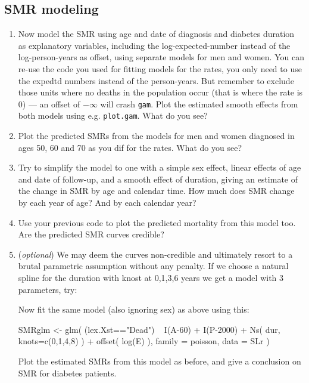 \subsection{SMR modeling}
\begin{enumerate}[resume]
\item Now model the SMR using age and date of diagnosis and diabetes
  duration as explanatory variables, including the log-expected-number
  instead of the log-person-years as offset, using separate models for
  men and women. 
  You can re-use the code you used for fitting models for the rates,
  you only need to use the expedtd numbers instead of the
  person-years. But remember to exclude those units where no deaths
  in the population occur (that is where the rate is 0) --- an
  offset of $-\infty$ will crash \texttt{gam}.
  Plot the estimated smooth effects from both models using
  e.g. \texttt{plot.gam}. What do you see?
\item Plot the predicted SMRs from the models for men and women
  diagnosed in ages 50, 60 and 70 as you dif for the rates. What do
  you see?
\item Try to simplify the model to one with a simple sex effect,
  linear effects of age and date of follow-up, and a smooth effect of
  duration, giving an estimate of the change in SMR by age and
  calendar time. How much does SMR change by each year of age? And by
  each calendar year?
\item Use your previous code to plot the predicted mortality from this
  model too. Are the predicted SMR curves credible?
\item (\emph{optional}) We may deem the curves non-credible and
  ultimately resort to a brutal parametric assumption without any
  penalty. If we choose a natural spline for the duration with knost
  at 0,1,3,6 years we get a model with 3 parameters, try:
\begin{Schunk}
\end{Schunk}
  Now fit the same model (also ignoring sex) as above using this:
\begin{Schunk}
\begin{Sinput}
 SMRglm <- glm( (lex.Xst=="Dead") ~ I(A-60) + 
                                    I(P-2000) + 
                                    Ns( dur, knots=c(0,1,4,8) ) +
                                    offset( log(E) ),
                family = poisson,
                  data = SLr )
\end{Sinput}
\end{Schunk}
  Plot the estimated SMRs from this model as before, and give a
  conclusion on SMR for diabetes patients.
\end{enumerate}
